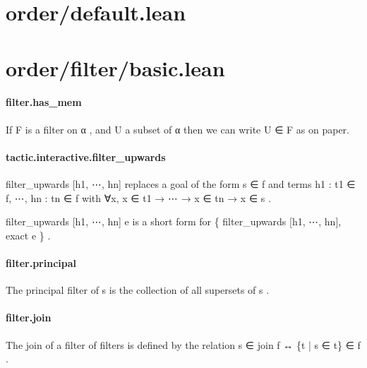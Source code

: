 \documentclass{article}
\begin{document}
\section{order/default.lean}\section{order/filter/basic.lean}\paragraph{filter.has\_mem}
\par
If 
\colorbox[RGB]{253,246,227}{{{{\color[RGB]{101, 123, 131} F }}}} is a filter on 
\colorbox[RGB]{253,246,227}{{{{\color[RGB]{101, 123, 131} α }}}}, and 
\colorbox[RGB]{253,246,227}{{{{\color[RGB]{101, 123, 131} U }}}} a subset of 
\colorbox[RGB]{253,246,227}{{{{\color[RGB]{101, 123, 131} α }}}} then we can write 
\colorbox[RGB]{253,246,227}{{{{\color[RGB]{101, 123, 131} U ∈ F }}}} as on paper.
\paragraph{tactic.interactive.filter\_upwards}
\par
\colorbox[RGB]{253,246,227}{{{{\color[RGB]{101, 123, 131} filter\_upwards {[}h1, ⋯, hn{]} }}}} replaces a goal of the form 
\colorbox[RGB]{253,246,227}{{{{\color[RGB]{101, 123, 131} s ∈ f }}}}and terms 
\colorbox[RGB]{253,246,227}{{{{\color[RGB]{101, 123, 131} h1 : t1 ∈ f, ⋯, hn : tn ∈ f }}}} with 
\colorbox[RGB]{253,246,227}{{{{\color[RGB]{101, 123, 131} ∀x, x ∈ t1  }}}{{{\color[RGB]{133, 153, 0} → }}}{{{\color[RGB]{101, 123, 131}  ⋯  }}}{{{\color[RGB]{133, 153, 0} → }}}{{{\color[RGB]{101, 123, 131}  x ∈ tn  }}}{{{\color[RGB]{133, 153, 0} → }}}{{{\color[RGB]{101, 123, 131}  x ∈ s }}}}.
\par
\colorbox[RGB]{253,246,227}{{{{\color[RGB]{101, 123, 131} filter\_upwards {[}h1, ⋯, hn{]} e }}}} is a short form for 
\colorbox[RGB]{253,246,227}{{{{\color[RGB]{101, 123, 131} \{ filter\_upwards {[}h1, ⋯, hn{]}, exact e \} }}}}.
\paragraph{filter.principal}
\par
The principal filter of 
\colorbox[RGB]{253,246,227}{{{{\color[RGB]{101, 123, 131} s }}}} is the collection of all supersets of 
\colorbox[RGB]{253,246,227}{{{{\color[RGB]{101, 123, 131} s }}}}.
\paragraph{filter.join}
\par
The join of a filter of filters is defined by the relation 
\colorbox[RGB]{253,246,227}{{{{\color[RGB]{101, 123, 131} s ∈ join f  }}}{{{\color[RGB]{181, 137, 0} ↔ }}}{{{\color[RGB]{101, 123, 131}  \{t | s ∈ t\} ∈ f }}}}.
\end{document}
